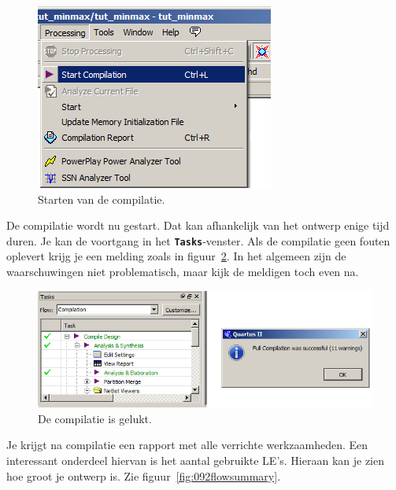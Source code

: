 \documentclass[a4paper,12pt,fleqn,twoside]{book}
\def\tutpicscale{0.455}
\newcommand{\menu}[1]{\texttt{\textbf{#1}}}
\begin{document}
\begin{figure}[H]
\centering
\includegraphics[scale=\tutpicscale]{090startcompilation.png}
\caption{Starten van de compilatie.}
\label{fig:090startcompilation}
\end{figure}

De compilatie wordt nu gestart. Dat kan afhankelijk van het ontwerp enige tijd duren. Je kan de 
voortgang in het \menu{Tasks}-venster. Als de compilatie geen fouten oplevert krijg je een melding 
zoals in figuur~\ref{fig:091compilationsucces}. In het algemeen zijn de waarschuwingen niet problematisch, maar kijk de 
meldigen toch even na.
 
\begin{figure}[H]
\centering
\includegraphics[scale=\tutpicscale]{091compilationsucces.png}
\caption{De compilatie is gelukt.}
\label{fig:091compilationsucces}
\end{figure}

Je krijgt na compilatie een rapport met alle verrichte werkzaamheden. Een interessant onderdeel 
hiervan is het aantal gebruikte LE's. Hieraan kan je zien hoe groot je ontwerp is.
Zie figuur~\ref{fig:092flowsummary}.
\end{document}
